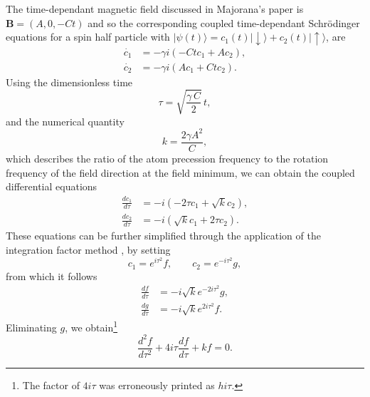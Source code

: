 The time-dependant magnetic field discussed in Majorana's paper \cite{Majorana1932} is ${\mathbf B} = \left(A, 0 , -Ct\right)$ and so the corresponding coupled time-dependant Schr\"odinger equations for a spin half particle with $\vert\psi(t)\rangle = c_{1}(t) \vert \downarrow\rangle + c_{2}(t) \vert \uparrow \rangle$, are
\begin{subequations}
\begin{align}
	\dot{c_{1}} &= - \gamma i \left(-Ctc_{1} + Ac_{2}\right),\\
	\dot{c_{2}} &= - \gamma i \left(A c_{1} + Ct c_{2}\right).
\end{align}
\end{subequations}
Using the dimensionless time
\begin{equation}
	\tau = \sqrt{\frac{\gamma \, C}{2}} \, t,
\end{equation}
and the numerical quantity
\begin{equation}
	k = \frac{2\gamma A^{2}}{C},
\end{equation}
which describes the ratio of the atom precession frequency to the rotation frequency of the field direction at the field minimum, we can obtain the coupled differential equations
\begin{subequations} \label{eq:Majprob}
\begin{align}
	\frac{dc_{1}}{d\tau} &= - i \left(-2\tau c_{1} + \sqrt{k}c_{2}\right),\\
	\frac{dc_{2}}{d\tau} &= -i \left(\sqrt{k} c_{1} + 2\tau c_{2}\right).
\end{align}
\end{subequations}
These equations can be further simplified through the application of the integration factor method \cite{Kreyszig2006}, by setting
\begin{equation}
	c_{1} = e^{i\tau^{2}}f, \quad \quad
	c_{2} = e^{-i\tau^{2}}g,
\end{equation}
from which it follows
\begin{subequations}
\begin{align}
	\frac{df}{d\tau} &= -i \sqrt{k} e^{-2i\tau^{2}}g,\\
	\frac{dg}{d\tau} &= -i \sqrt{k} e^{2i\tau^{2}}f. \label{Eq:dgdt}
\end{align}
\end{subequations}
Eliminating $g$, we obtain\footnote{The factor of $4i\tau$ was erroneously printed as $hi\tau$.}
\begin{equation}
	\frac{d^{2}f}{d\tau^{2}} + 4 i \tau \frac{df}{d\tau} + kf = 0. \label{Eq:fDiff}
\end{equation}
